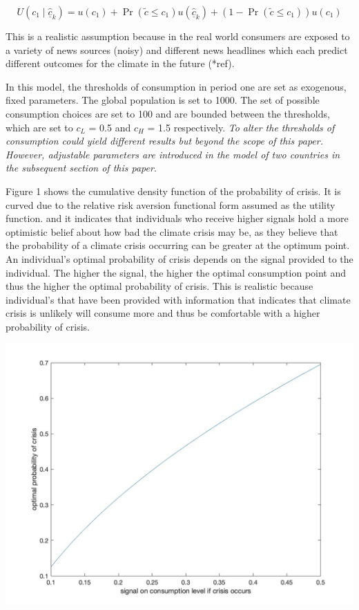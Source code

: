 \documentclass[11pt,preprint, authoryear]{elsarticle}
\let\origfigure\figure
\let\endorigfigure\endfigure
\renewenvironment{figure}[1][2] {
    \expandafter\origfigure\expandafter[H]
} {
    \endorigfigure
}
\numberwithin{equation}{section}
\numberwithin{figure}{section}
\numberwithin{table}{section}
\begin{document}
\[
U\left(c_1 \mid \hat{\underline{c}}_{k}\right)=u\left(c_1\right)+\operatorname{Pr}\left(\tilde{c} \leq c_1\right) u\left(\hat{\underline{c}}_{k}\right)+\left(1-\operatorname{Pr}\left(\tilde{c} \leq c_1\right)\right) u\left(c_1\right)
\]

This is a realistic assumption because in the real world consumers are
exposed to a variety of news sources (noisy) and different news
headlines which each predict different outcomes for the climate in the
future (*ref).

In this model, the thresholds of consumption in period one are set as
exogenous, fixed parameters. The global population is set to 1000. The
set of possible consumption choices are set to 100 and are bounded
between the thresholds, which are set to \(c_L\) = 0.5 and \(c_H\) = 1.5
respectively. \emph{To alter the thresholds of consumption could yield
different results but beyond the scope of this paper. However,
adjustable parameters are introduced in the model of two countries in
the subsequent section of this paper}.

Figure 1 shows the cumulative density function of the probability of
crisis. It is curved due to the relative risk aversion functional form
assumed as the utility function. and it indicates that individuals who
receive higher signals hold a more optimistic belief about how bad the
climate crisis may be, as they believe that the probability of a climate
crisis occurring can be greater at the optimum point. An individual's
optimal probability of crisis depends on the signal provided to the
individual. The higher the signal, the higher the optimal consumption
point and thus the higher the optimal probability of crisis. This is
realistic because individual's that have been provided with information
that indicates that climate crisis is unlikely will consume more and
thus be comfortable with a higher probability of crisis.

\begin{figure}[H]

{\centering \includegraphics[width=0.8\linewidth]{images/Figure1base} 

}

\caption{Optimal probability of crisis as mapped from the different beliefs of the optimal consumption level}\label{fig:unnamed-chunk-1}
\end{figure}
\end{document}
